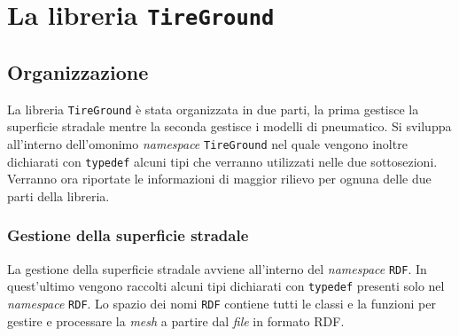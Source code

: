 \chapter{La libreria \texttt{TireGround}}
\label{Codice}
%
\section{Organizzazione}
La libreria \texttt{TireGround} è stata organizzata in due parti, la prima gestisce la superficie stradale mentre la seconda gestisce i modelli di pneumatico. Si sviluppa all'interno dell'omonimo \textit{namespace} \texttt{TireGround} nel quale vengono inoltre dichiarati con \texttt{typedef} alcuni tipi che verranno utilizzati nelle due sottosezioni. Verranno ora riportate le informazioni di maggior rilievo per ognuna delle due parti della libreria.

\subsection{Gestione della superficie stradale} 
La gestione della superficie stradale avviene all'interno del \textit{namespace} \texttt{RDF}. In quest'ultimo vengono raccolti alcuni tipi dichiarati con \texttt{typedef} presenti solo nel \textit{namespace} \texttt{RDF}. Lo spazio dei nomi \texttt{RDF} contiene tutti le classi e la funzioni per gestire e processare la \textit{mesh} a partire dal \textit{file} in formato \ac{RDF}.
%
